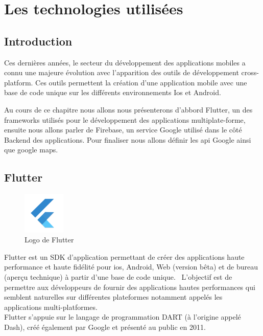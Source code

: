 %  

\chapter{Les technologies utilisées}
\section{Introduction}
Ces dernières années, le secteur du développement des applications mobiles a connu une majeure évolution avec l’apparition des outils de développement cross-platform. Ces outils permettent la création d’une application mobile avec une base de code unique sur les différents environnements Ios et Android. 

Au cours de ce chapitre nous allons nous présenterons d'abbord Flutter, un des frameworks utilisés pour le développement des applications multiplate-forme, ensuite nous allons parler de Firebase,  un service Google utilisé dans le côté Backend des applications. Pour finaliser nous allons définir les api Google ainsi que google maps.
\section{Flutter}
\begin{figure}
    \vspace{-15pt}
    \includegraphics[width=2cm]{images/flutterLogo.png}
    \vspace{-15pt}
\caption{{\footnotesize Logo de Flutter}}
\end{figure}
Flutter est un SDK d'application permettant de créer des applications haute performance et haute fidélité pour ios, Android, Web (version bêta) et de bureau (aperçu technique) à partir d'une base de code unique.~\cite{TechnicalOverview}
L'objectif est de permettre aux développeurs de fournir des applications hautes performances qui semblent naturelles sur différentes plateformes notamment appelés les applications multi-platformes.
\\
Flutter s’appuie sur le langage de programmation DART (à l’origine appelé Dash), créé également par Google et présenté au public en 2011.

